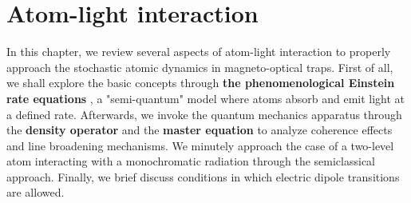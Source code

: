 %
\chapter{Atom-light interaction}
\label{ch:atom-light-interaction}
%

In this chapter, we review several aspects of atom-light interaction \cite{weiner2003light} to properly approach the stochastic atomic dynamics in magneto-optical traps. First of all, we shall explore the basic concepts through \textbf{the phenomenological Einstein rate equations} \cite{foot2005atomic}, a "semi-quantum" model where atoms absorb and emit light at a defined rate. Afterwards, we invoke the quantum mechanics apparatus through the \textbf{density operator} and the \textbf{master equation} \cite{steck2007quantum} to analyze coherence effects and line broadening mechanisms. We minutely approach the case of a two-level atom interacting with a monochromatic radiation through the semiclassical approach. Finally, we brief discuss conditions in which electric dipole transitions are allowed.



%



%


%

%
%

%
%

%
%
